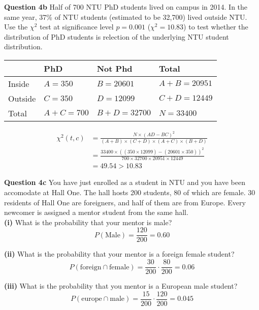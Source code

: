 \documentclass[11pt,a4paper]{report}
\begin{document}
\begin{multicols*}{2}
\noindent \textbf{Question 4b} Half of 700 NTU PhD students lived on campus in 2014. In the same year, 37\% of NTU students (estimated to be 32,700) lived outside NTU. Use the $\chi^2$ test at significance level $p=0.001$ ($\chi^2=10.83$) to test whether the distribution of PhD students is relection of the underlying NTU student distribution.

\scriptsize
\begin{center}
\begin{tabular}{ |l|l|l|l| } 
    \hline
            & PhD       & Not Phd     & Total \\
    \hline 
    Inside  & $A = 350$ & $B = 20601$ & $A+B=20951$ \\
    Outside & $C = 350$ & $D = 12099$ & $C+D=12449$ \\
    Total   & $A+C=700$ & $B+D=32700$ & $N=33400$ \\
    \hline
\end{tabular}
\end{center}
\normalsize

\begin{equation*}
\begin{split}
   \chi^2(t,c) &= \frac{N\times (AD - BC)^2}{(A+B) \times (C+D) \times (A+C) \times (B+D)} \\
   &= \frac{33400\times ((350 \times 12099) - (20601 \times 350))^2}{700\times 32700 \times 20951 \times 12449}\\
   &= 49.54 > 10.83
\end{split}
\end{equation*}

\noindent \textbf{Question 4c} You have just enrolled as a student in NTU and you have been accomodate at Hall One. The hall hosts 200 students, 80 of which are female. 30 residents of Hall One are foreigners, and half of them are from Europe. Every newcomer is assigned a mentor student from the same hall.\\

\noindent \textbf{(i)} What is the probability that your mentor is male?
$$P(\text{Male}) = \frac{120}{200} = 0.60$$

\noindent \textbf{(ii)} What is the probability that your mentor is a foreign female student?
$$P(\text{foreign} \cap \text{female}) = \frac{30}{200}\cdot \frac{80}{200}=0.06$$

\noindent \textbf{(iii)} What is the probability that you mentor is a European male student?
$$P(\text{europe} \cap \text{male}) = \frac{15}{200}\cdot \frac{120}{200}=0.045$$


\end{multicols*}
\end{document}

